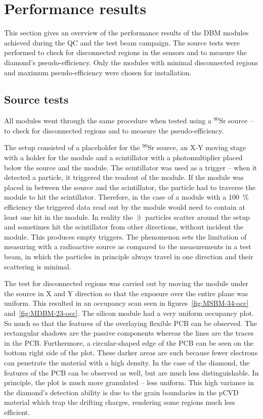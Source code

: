 \section{Performance results}
\label{sec:perfresults}
This section gives an overview of the performance results of the DBM modules achieved during the QC and the test beam campaign. The source tests were performed to check for disconnected regions in the sensors and to measure the diamond's pseudo-efficiency. Only the modules with minimal disconnected regions and maximum pseudo-efficiency were chosen for installation. 

\subsection{Source tests}
All modules went through the same procedure when tested using a $^{90}$Sr source -- to check for disconnected regions and to measure the pseudo-efficiency. 

The setup consisted of a placeholder for the $^{90}$Sr source, an X-Y moving stage with a holder for the module and a scintillator with a photomultiplier placed below the source and the module. The scintillator was used as a trigger -- when it detected a particle, it triggered the readout of the module. If the module was placed in between the source and the scintillator, the particle had to traverse the module to hit the scintillator. Therefore, in the case of a module with a 100~\% efficiency the triggered data read out by the module would need to contain at least one hit in the module. In reality the $\upbeta$ particles scatter around the setup and sometimes hit the scintillator from other directions, without incident the module. This produces empty triggers. The phenomenon sets the limitation of measuring with a radioactive source as compared to the measurements in a test beam, in which the particles in principle always travel in one direction and their scattering is minimal. 

The test for disconnected regions was carried out by moving the module under the source in X and Y direction so that the exposure over the entire plane was uniform. This resulted in an occupancy scan seen in figures~\ref{fig:MSBM-34-occ} and~\ref{fig:MDBM-23-occ}. The silicon module had a very uniform occupancy plot. So much so that the features of the overlaying flexible PCB can be observed. The rectangular shadows are the passive components whereas the lines are the traces in the PCB. Furthermore, a circular-shaped edge of the PCB can be seen on the bottom right side of the plot. These darker areas are such because fewer electrons can penetrate the material with a high density. In the case of the diamond, the features of the PCB can be observed as well, but are much less distinguishable. In principle, the plot is much more granulated -- less uniform. This high variance in the diamond's detection ability is due to the grain boundaries in the pCVD material which trap the drifting charges, rendering some regions much less efficient. 

